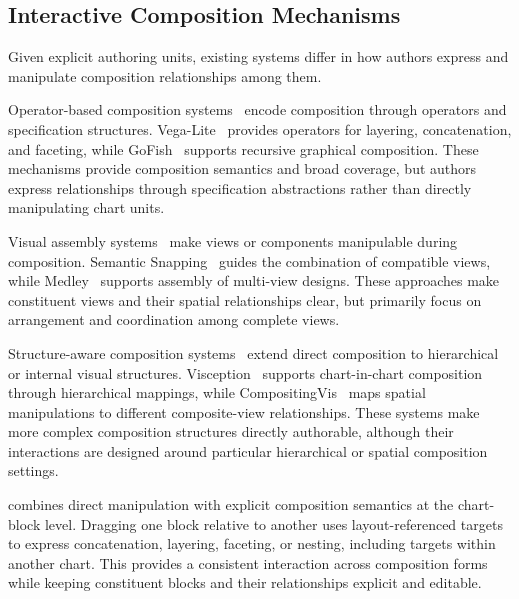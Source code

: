 \subsection{Interactive Composition Mechanisms}
\label{sec:related-composition-systems}

Given explicit authoring units, existing systems differ in how authors express
and manipulate composition relationships among them.

Operator-based composition systems~\cite{VegaLite,Vega,
ggplot2LayeredGrammarofGraphics,Altair,ApacheECharts,Atlas,ATOM,
ComputableViz,GoFish,Gosling,GenomeSpy,GoTree,Cicero,Nebula,Mosaic,Encodable}
encode composition through operators and specification structures.
Vega-Lite~\cite{VegaLite} provides operators for layering,
concatenation, and faceting, while GoFish~\cite{GoFish} supports recursive
graphical composition. These mechanisms provide composition semantics
and broad coverage, but authors express relationships through specification
abstractions rather than directly manipulating chart units.


Visual assembly systems~\cite{SnapTogetherVisualization,Improvise,VisMashup,
VisComposer,SemanticSnapping,Medley,MultiVision,DrillboardsDrillVis,
QuickDashboard,QualDash,Pilingjs,GEViTRec} make views or components
manipulable during composition. Semantic Snapping~\cite{
SemanticSnapping} guides the combination of compatible views, while
Medley~\cite{Medley} supports assembly of multi-view designs.
These approaches make constituent views and their spatial relationships clear,
but primarily focus on arrangement and coordination among complete views.

Structure-aware composition systems~\cite{Visception,CompositingVis} extend
direct composition to hierarchical or internal visual structures.
Visception~\cite{Visception} supports chart-in-chart composition through
hierarchical mappings, while CompositingVis~\cite{CompositingVis} maps spatial
manipulations to different composite-view relationships. These systems make
more complex composition structures directly authorable, although their
interactions are designed around particular hierarchical or spatial
composition settings.

{\system} combines direct manipulation with explicit composition semantics at
the chart-block level. Dragging one block relative to another uses
layout-referenced targets to express concatenation, layering, faceting, or
nesting, including targets within another chart. This provides a consistent
interaction across composition forms while keeping constituent blocks and
their relationships explicit and editable.
